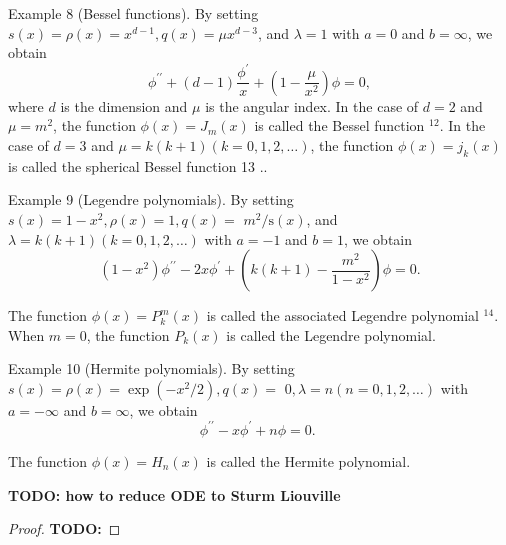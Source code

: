 Example 8 (Bessel functions). By setting $s(x)=\rho(x)=x^{d-1}, q(x)=\mu x^{d-3}$, and $\lambda=1$ with $a=0$ and $b=\infty$, we obtain
$$
\phi^{\prime \prime}+(d-1) \frac{\phi^{\prime}}{x}+\left(1-\frac{\mu}{x^2}\right) \phi=0,
$$
where $d$ is the dimension and $\mu$ is the angular index. In the case of $d=2$ and $\mu=m^2$, the function $\phi(x)=J_m(x)$ is called the Bessel function ${ }^{12}$. In the case of $d=3$ and $\mu=k(k+1)(k=0,1,2, \ldots)$, the function $\phi(x)=j_k(x)$ is called the spherical Bessel function 13 ..

Example 9 (Legendre polynomials). By setting $s(x)=1-x^2, \rho(x)=1, q(x)=$ $m^2 / \mathrm{s}(x)$, and $\lambda=k(k+1)(k=0,1,2, \ldots)$ with $a=-1$ and $b=1$, we obtain
$$
\left(1-x^2\right) \phi^{\prime \prime}-2 x \phi^{\prime}+\left(k(k+1)-\frac{m^2}{1-x^2}\right) \phi=0 .
$$

The function $\phi(x)=P_k^m(x)$ is called the associated Legendre polynomial ${ }^{14}$. When $m=0$, the function $P_k(x)$ is called the Legendre polynomial.

Example 10 (Hermite polynomials). By setting $s(x)=\rho(x)=\exp \left(-x^2 / 2\right), q(x)=$ $0, \lambda=n(n=0,1,2, \ldots)$ with $a=-\infty$ and $b=\infty$, we obtain
$$
\phi^{\prime \prime}-x \phi^{\prime}+n \phi=0 \text {. }
$$

The function $\phi(x)=H_n(x)$ is called the Hermite polynomial.

\begin{theorem}[]
    \textbf{TODO: how to reduce ODE to Sturm Liouville}
\end{theorem}
\begin{proof}
    \textbf{TODO: }
\end{proof}

